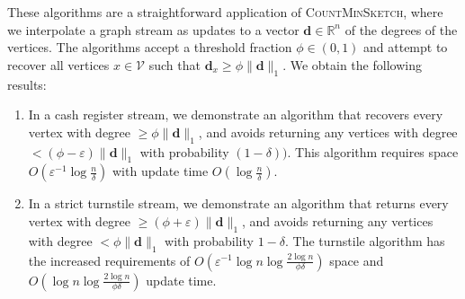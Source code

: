 \documentclass[10]{report}
\newcommand{\algoname}[1]{\textnormal{\textsc{#1}}}
\begin{document}
These algorithms are a straightforward application of \algoname{CountMinSketch}, where we interpolate a graph stream as updates to a vector $\mathbf{d} \in \mathbb{R}^n$ of the degrees of the vertices.
The algorithms accept a threshold fraction $\phi \in (0,1)$ and attempt to recover all vertices $x \in \mathcal{V}$ such that $\mathbf{d}_x \geq \phi \|\mathbf{d}\|_1$.
We obtain the following results:
\begin{enumerate}
	\item In a cash register stream, we demonstrate an algorithm that recovers every vertex with degree $\geq \phi \|\mathbf{d}\|_1$, and avoids returning any vertices with degree $< (\phi - \varepsilon) \|\mathbf{d}\|_1$ with probability $(1-\delta))$.
This algorithm requires space $O(\varepsilon^{-1} \log \frac{n}{\delta})$ with update time $O(\log \frac{n}{\delta})$.
	\item In a strict turnstile stream, we demonstrate an algorithm that returns every vertex with degree $\geq (\phi + \varepsilon) \|\mathbf{d}\|_1$, and avoids returning any vertices with degree $< \phi \|\mathbf{d}\|_1$ with probability $1 - \delta$. 
The turnstile algorithm has the increased requirements of $O(\varepsilon^{-1} \log n \log \frac{2 \log n}{\phi \delta})$ space and $O(\log n \log \frac{2\log n}{\phi \delta})$ update time.
\end{enumerate}
\end{document}
